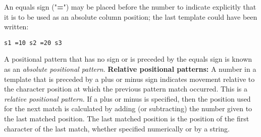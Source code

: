 An equals sign ("\textbf{=}") may be placed before the number
to indicate explicitly that it is to be used as an absolute column
position; the last template could have been written:
\begin{lstlisting}
s1 =10 s2 =20 s3
\end{lstlisting}
 A positional pattern that has no sign or is preceded by the
equals sign is known as an \emph{absolute positional pattern}.
 \textbf{Relative positional patterns:}
A number in a template that is preceded by a plus or minus sign
indicates
movement relative to the character position at which the previous
pattern match occurred.
This is a \emph{relative positional pattern}.
 If a plus or minus
is specified, then the position used for the next
match is calculated by adding (or subtracting) the number given to the
last matched position.
The last matched position is the position of the first character of the
last match, whether specified numerically or by a string.
 
